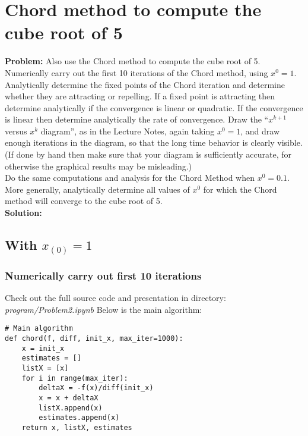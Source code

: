 \newpage
\section{Chord method to compute the cube root of 5}%
\label{sec:chord_method_to_compute_the_cube_root_of_5}

\textbf{Problem:}
Also use the Chord method to compute the cube root of 5.
Numerically carry out the first 10 iterations of the Chord method, using $x^{0} = 1$. 
Analytically determine the fixed points of the Chord iteration and determine whether they are attracting or repelling.
If a fixed point is attracting then determine analytically if the convergence is linear or quadratic.
If the convergence is linear then determine analytically the rate of convergence.
Draw the “$x^{k+1}$ versus $x^{k}$ diagram”, as in the Lecture Notes, again taking $x^{0} = 1$, and draw enough iterations in the diagram, so that the long time behavior is clearly visible.
(If done by hand then make sure that your diagram is sufficiently accurate, for otherwise the graphical results may be misleading.)
\\
Do the same computations and analysis for the Chord Method when $x^{0} = 0.1$.
\\
More generally, analytically determine all values of $x^{0}$ for which the Chord method will converge to the cube root of 5.
\\
\textbf{Solution:}
\subsection{With $x_{(0)} = 1$}

\subsubsection{Numerically carry out first 10 iterations}
Check out the full source code and presentation in directory: \textit{program/Problem2.ipynb}
Below is the main algorithm:

\begin{lstlisting}
# Main algorithm
def chord(f, diff, init_x, max_iter=1000):
    x = init_x
    estimates = []
    listX = [x]
    for i in range(max_iter):
        deltaX = -f(x)/diff(init_x)
        x = x + deltaX
        listX.append(x)
        estimates.append(x)
    return x, listX, estimates
\end{lstlisting}

